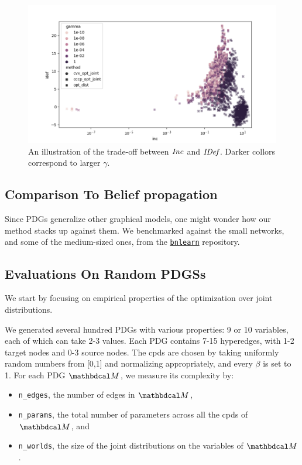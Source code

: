 \documentclass[twoside]{article}
\begin{document}
\begin{figure}
    \includegraphics[width=\linewidth]{figs/inc-idef2}
    \caption{An illustration of the trade-off between $\mathit{Inc}$ and $\mathit{IDef}_{\!}$. Darker collors correspond to larger $\gamma$.}\label{fig:inc-idef}
\end{figure}

\subsection{Comparison To Belief propagation}

Since PDGs generalize other graphical models, one might wonder how our method stacks up against them.
We benchmarked against the small networks, and some of the medium-sized ones, from the \href{https://www.bnlearn.com/bnrepository/}{\texttt{bnlearn}} repository.



\subsection{Evaluations On Random PDGSs}
We start by focusing on empirical properties of the optimization over joint distributions.

We generated several hundred PDGs with various properties: 9 or 10 variables, each of which can take 2-3 values. Each PDG contains 7-15 hyperedges, with 1-2 target nodes and 0-3 source nodes. The cpds are chosen by taking uniformly random numbers from [0,1] and normalizing appropriately, and every $\beta$ is set to 1.
For each PDG $\dg M$, we measure its complexity by:
\begin{itemize}[nosep]
    \item \texttt{n\_edges}, the number of edges in $\dg M$,
    \item \texttt{n\_params}, the total number of parameters across all the cpds of $\dg M$, and
    \item \texttt{n\_worlds}, the size of the joint distributions on the variables of $\dg M$.
\end{itemize}
\end{document}
